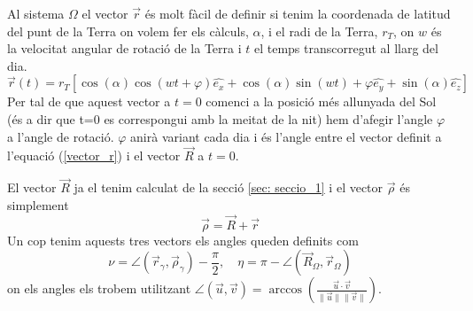 \documentclass[11pt]{article}
\begin{document}
Al sistema $\Omega$ el vector $\vec{r}$ és molt fàcil de definir si tenim la coordenada de latitud del punt de la Terra on volem fer els càlculs, $\alpha$, i el radi de la Terra, $r_T$, on $w$ és la velocitat angular de rotació de la Terra i $t$ el temps transcorregut al llarg del dia. 
\begin{equation}
    \vec{r}(t)=r_T[\cos(\alpha)\cos(wt+\varphi)\hat{e_x}+\cos(\alpha)\sin(wt)+\varphi\hat{e_y}+\sin(\alpha)\hat{e_z}]
    \label{vector_r}
\end{equation}
Per tal de que aquest vector a $t=0$ comenci a la posició més allunyada del Sol (és a dir que t=0 es correspongui amb la meitat de la nit) hem d'afegir l'angle $\varphi$ a l'angle de rotació. $\varphi$ anirà variant cada dia i és l'angle entre el vector definit a l'equació (\ref{vector_r}) i el vector $\vec{R}$ a $t=0$.

El vector $\vec{R}$ ja el tenim calculat de la secció \ref{sec: seccio_1} i el vector $\vec{\rho}$ és simplement
\begin{equation}
    \vec{\rho}= \vec{R}+\vec{r}
\end{equation}
Un cop tenim aquests tres vectors els angles queden definits com
\begin{equation}
    \nu=\angle (\vec{r}_{\gamma}, \vec{\rho}_{\gamma}) -\frac{\pi}{2},  \quad
\eta=\pi - \angle (\vec{R}_{\Omega}, \vec{r}_{\Omega})
\end{equation}
on els angles els trobem utilitzant $\angle (\vec{u}, \vec{v})= \arccos\left(\frac{\vec{u} \cdot \vec{v}}{\|\vec{u}\| \|\vec{v}\|}\right)$.
\end{document}

